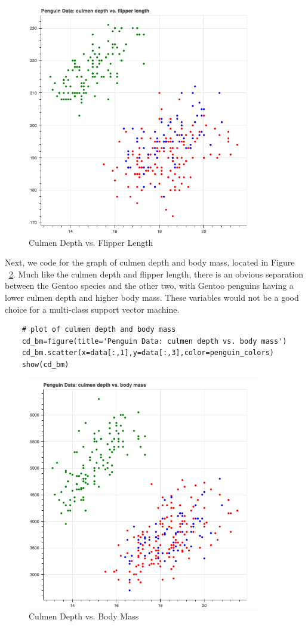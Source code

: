 \documentclass[12pt]{article}
\begin{document}
\begin{figure}[H]
    \centering
    \includegraphics[width=4in]{Figures/penguins/cd_fl.png}
    \caption{Culmen Depth vs. Flipper Length}
    \label{fig_cd_fl}
\end{figure}

Next, we code for the graph of culmen depth and body mass, located in Figure ~\ref{fig_cd_bm}. Much like the culmen depth and flipper length, there is an obvious separation between the Gentoo species and the other two, with Gentoo penguins having a lower culmen depth and higher body mass. These variables would not be a good choice for a multi-class support vector machine.

\begin{verbatim}
    # plot of culmen depth and body mass
    cd_bm=figure(title='Penguin Data: culmen depth vs. body mass')
    cd_bm.scatter(x=data[:,1],y=data[:,3],color=penguin_colors)
    show(cd_bm)
\end{verbatim}

\begin{figure}[H]
    \centering
    \includegraphics[width=4in]{Figures/penguins/cd_bm.png}
    \caption{Culmen Depth vs. Body Mass}
    \label{fig_cd_bm}
\end{figure}
\end{document}
